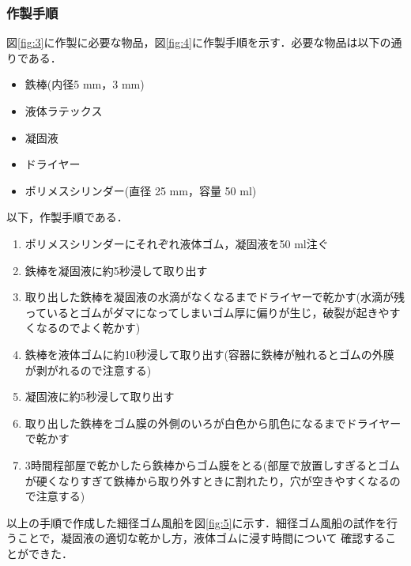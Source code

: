 \subsubsection{作製手順}
図\ref{fig:3}に作製に必要な物品，図\ref{fig:4}に作製手順を示す．必要な物品は以下の通りである．
\begin{itemize}
    \item 鉄棒(内径5 mm，3 mm)
    \item 液体ラテックス
    \item 凝固液
    \item ドライヤー 
    \item ポリメスシリンダー(直径 25 mm，容量 50 ml)
  \end{itemize}
  以下，作製手順である．
\begin{enumerate}
    \item ポリメスシリンダーにそれぞれ液体ゴム，凝固液を50 ml注ぐ　
    \item 鉄棒を凝固液に約5秒浸して取り出す
    \item 取り出した鉄棒を凝固液の水滴がなくなるまでドライヤーで乾かす(水滴が残っているとゴムがダマになってしまいゴム厚に偏りが生じ，破裂が起きやすくなるのでよく乾かす)
    \item 鉄棒を液体ゴムに約10秒浸して取り出す(容器に鉄棒が触れるとゴムの外膜が剥がれるので注意する)
    \item 凝固液に約5秒浸して取り出す
    \item 取り出した鉄棒をゴム膜の外側のいろが白色から肌色になるまでドライヤーで乾かす
    \item 3時間程部屋で乾かしたら鉄棒からゴム膜をとる(部屋で放置しすぎるとゴムが硬くなりすぎて鉄棒から取り外すときに割れたり，穴が空きやすくなるので注意する)
\end{enumerate}
以上の手順で作成した細径ゴム風船を図\ref{fig:5}に示す．細径ゴム風船の試作を行うことで，凝固液の適切な乾かし方，液体ゴムに浸す時間について
確認することができた．

